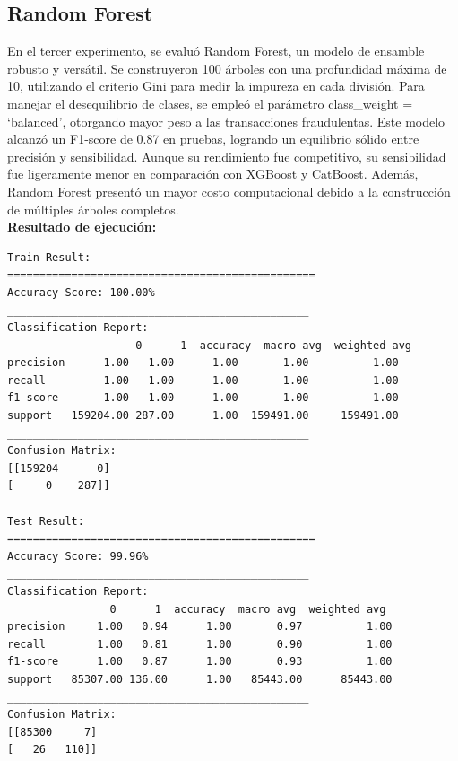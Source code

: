 \documentclass[9pt,a4paper,twoside]{rho-class/rho}
\begin{document}
        \subsection{Random Forest}
            En el tercer experimento, se evaluó Random Forest, un modelo de ensamble robusto y versátil. Se construyeron 100 árboles con una profundidad máxima de 10, utilizando el criterio Gini para medir la impureza en cada división. Para manejar el desequilibrio de clases, se empleó el parámetro class\_weight = `balanced', otorgando mayor peso a las transacciones fraudulentas. Este modelo alcanzó un F1-score de 0.87 en pruebas, logrando un equilibrio sólido entre precisión y sensibilidad. Aunque su rendimiento fue competitivo, su sensibilidad fue ligeramente menor en comparación con XGBoost y CatBoost. Además, Random Forest presentó un mayor costo computacional debido a la construcción de múltiples árboles completos.
        \\
        \textbf{Resultado de ejecución:}\\
\small
\begin{verbatim}
Train Result:
================================================
Accuracy Score: 100.00%
_______________________________________________
Classification Report:
                    0      1  accuracy  macro avg  weighted avg
precision      1.00   1.00      1.00       1.00          1.00
recall         1.00   1.00      1.00       1.00          1.00
f1-score       1.00   1.00      1.00       1.00          1.00
support   159204.00 287.00      1.00  159491.00     159491.00
_______________________________________________
Confusion Matrix: 
[[159204      0]
[     0    287]]

Test Result:
================================================
Accuracy Score: 99.96%
_______________________________________________
Classification Report:
                0      1  accuracy  macro avg  weighted avg
precision     1.00   0.94      1.00       0.97          1.00
recall        1.00   0.81      1.00       0.90          1.00
f1-score      1.00   0.87      1.00       0.93          1.00
support   85307.00 136.00      1.00   85443.00      85443.00
_______________________________________________
Confusion Matrix: 
[[85300     7]
[   26   110]]
\end{verbatim}
\normalsize
\end{document}
